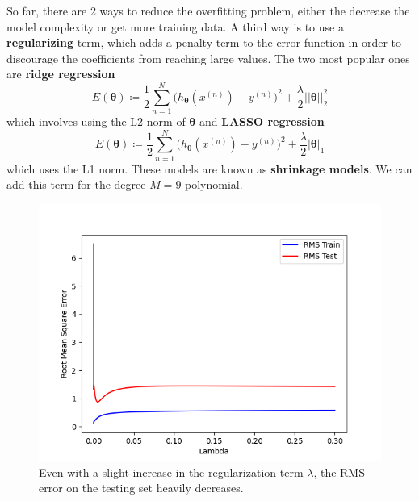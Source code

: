 \documentclass{article}
\theoremstyle{definition}
\theoremstyle{remark}
\theoremstyle{definition}
\begin{document}
So far, there are 2 ways to reduce the overfitting problem, either the decrease the model complexity or get more training data. A third way is to use a \textbf{regularizing} term, which adds a penalty term to the error function in order to discourage the coefficients from reaching large values. The two most popular ones are \textbf{ridge regression} 
\[E(\boldsymbol{\theta}) \coloneqq \frac{1}{2} \sum_{n=1}^N \big( h_{\boldsymbol{\theta}} (x^{(n)}) - y^{(n)} \big)^2 + \frac{\lambda}{2} ||\boldsymbol{\theta}||_2^2\]
which involves using the L2 norm of $\boldsymbol{\theta}$ and \textbf{LASSO regression} 
\[E(\boldsymbol{\theta}) \coloneqq \frac{1}{2} \sum_{n=1}^N \big( h_{\boldsymbol{\theta}} (x^{(n)}) - y^{(n)} \big)^2 + \frac{\lambda}{2} |\boldsymbol{\theta}|_1\]
which uses the L1 norm. These models are known as \textbf{shrinkage models}. We can add this term for the degree $M=9$ polynomial. 
\begin{figure}[hbt!]
    \centering
    \includegraphics[scale=0.5]{polynomial_first/Lambda_vs_RMS.png}
    \caption{Even with a slight increase in the regularization term $\lambda$, the RMS error on the testing set heavily decreases. }
    \label{fig:enter-label}
\end{figure}
\end{document}
